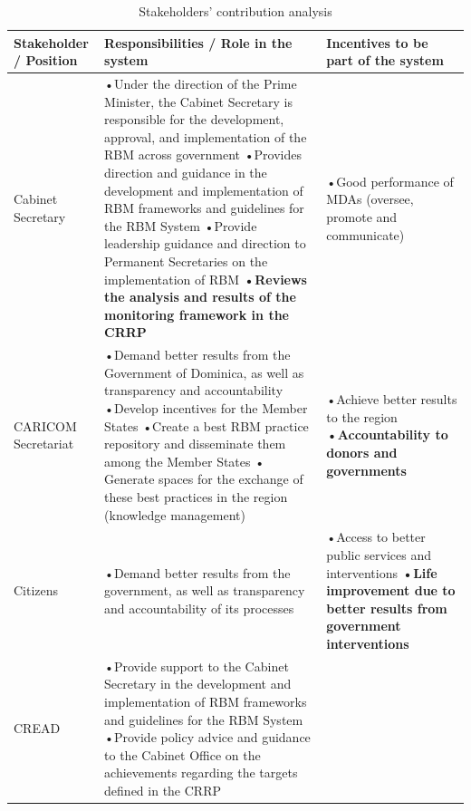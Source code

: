 \documentclass[
  10pt,
]{book}
\begin{document}
\begin{table}

\caption{\label{tab:unnamed-chunk-1}Stakeholders’ contribution analysis}
\centering
\fontsize{12}{14}\selectfont
\begin{tabu} to 
\hline
Stakeholder / Position & Responsibilities / Role in the system & Incentives to be part of the system\\
\hline
Cabinet Secretary & •Under the direction of the Prime Minister, the Cabinet Secretary is responsible for the development, approval, and implementation of the RBM across government 
•Provides direction and guidance in the development and implementation of RBM frameworks and guidelines for the RBM System 
•Provide leadership guidance and direction to Permanent Secretaries on the implementation of RBM
\textbf{•Reviews the analysis and results of the monitoring framework in the CRRP} & •Good performance of MDAs (oversee, promote and communicate)\\
\hline
CARICOM Secretariat & •Demand better results from the Government of Dominica, as well as transparency and accountability
•Develop incentives for the Member States
•Create a best RBM practice repository and disseminate them among the Member States 
• Generate spaces for the exchange of these best practices in the region (knowledge management) & •Achieve better results to the region
\textbf{•Accountability to donors and governments}\\
\hline
Citizens & •Demand better results from the government, as well as transparency and accountability of its processes & •Access to better public services and interventions
\textbf{•Life improvement due to better results from government interventions}\\
\hline
CREAD & •Provide support to the Cabinet Secretary in the development and implementation of RBM frameworks and guidelines for the RBM System
•Provide policy advice and guidance to the Cabinet Office on the achievements regarding the targets defined in the CRRP


\end{tabu}
\end{table}
\end{document}
